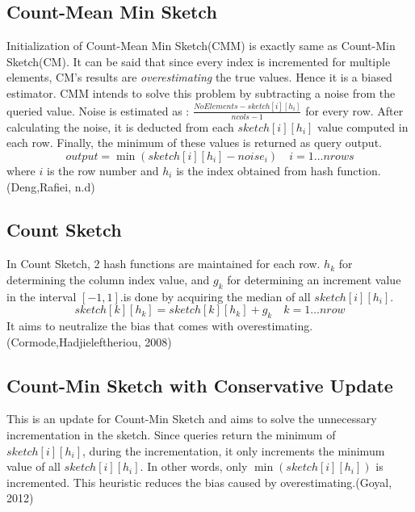 \documentclass[twoside]{article}
\begin{document}
\subsection{Count-Mean Min Sketch}
Initialization of Count-Mean Min Sketch(CMM) is exactly same as Count-Min Sketch(CM). It can be said that since every index is incremented for multiple elements, CM's results are \textit{overestimating} the true values. Hence it is a biased estimator. CMM intends to solve this problem by subtracting a noise from the queried value. Noise is estimated as : $\frac{NoElements - sketch[i][h_{i}]}{ncols- 1}  $ for every row. After calculating the noise, it is deducted from each $sketch[i][h_{i}]$ value computed in each row. Finally, the minimum of these values is returned as query output.$$
output=\min(sketch[i][h_{i}]-noise_{i})\quad i=1 \dots nrows$$ where $i$ is the row number and $h_ {i}$ is the index obtained from hash function. (Deng,Rafiei, n.d)


\subsection{Count Sketch}
In Count Sketch, 2 hash functions are maintained for each row. $h_{k}$ for determining the column index value, and $g_{k}$ for determining an increment value in the interval $[-1,1]$.is done by acquiring the median of all $sketch[i][h_{i}]$.
$$sketch[k][h_{k}]=sketch[k][h_{k}]+ g_{k} \quad  k=1 \dots nrow$$
It aims to neutralize the bias that comes with overestimating. (Cormode,Hadjieleftheriou, 2008)
\subsection{Count-Min Sketch with Conservative Update }
This is an update for Count-Min Sketch and aims to solve the unnecessary incrementation in the sketch. Since queries return the minimum of $sketch[i][h_{i}]$, during the incrementation, it only increments the minimum value of all $sketch[i][h_{i}]$. In other words, only $\min (sketch[i][h_{i}])$ is incremented. This heuristic reduces the bias caused by overestimating.(Goyal, 2012)
\end{document}
